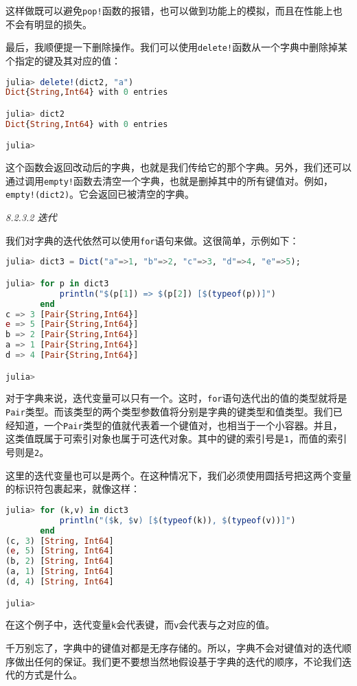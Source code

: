 这样做既可以避免\verb`pop!`函数的报错，也可以做到功能上的模拟，而且在性能上也不会有明显的损失。

最后，我顺便提一下删除操作。我们可以使用\verb`delete!`函数从一个字典中删除掉某个指定的键及其对应的值：
\begin{lstlisting}[language=julia]
julia> delete!(dict2, "a")
Dict{String,Int64} with 0 entries

julia> dict2
Dict{String,Int64} with 0 entries

julia> 
\end{lstlisting}

这个函数会返回改动后的字典，也就是我们传给它的那个字典。另外，我们还可以通过调用\verb`empty!`函数去清空一个字典，也就是删掉其中的所有键值对。例如，\verb`empty!(dict2)`。它会返回已被清空的字典。

\textsl{8.2.3.2 迭代}

我们对字典的迭代依然可以使用\verb`for`语句来做。这很简单，示例如下：
\begin{lstlisting}[language=julia]
julia> dict3 = Dict("a"=>1, "b"=>2, "c"=>3, "d"=>4, "e"=>5);

julia> for p in dict3
           println("$(p[1]) => $(p[2]) [$(typeof(p))]")
       end
c => 3 [Pair{String,Int64}]
e => 5 [Pair{String,Int64}]
b => 2 [Pair{String,Int64}]
a => 1 [Pair{String,Int64}]
d => 4 [Pair{String,Int64}]

julia> 
\end{lstlisting}

对于字典来说，迭代变量可以只有一个。这时，\verb`for`语句迭代出的值的类型就将是\verb`Pair`类型。而该类型的两个类型参数值将分别是字典的键类型和值类型。我们已经知道，一个\verb`Pair`类型的值就代表着一个键值对，也相当于一个小容器。并且，这类值既属于可索引对象也属于可迭代对象。其中的键的索引号是\verb`1`，而值的索引号则是\verb`2`。

这里的迭代变量也可以是两个。在这种情况下，我们必须使用圆括号把这两个变量的标识符包裹起来，就像这样：
\begin{lstlisting}[language=julia]
julia> for (k,v) in dict3
           println("($k, $v) [$(typeof(k)), $(typeof(v))]")
       end
(c, 3) [String, Int64]
(e, 5) [String, Int64]
(b, 2) [String, Int64]
(a, 1) [String, Int64]
(d, 4) [String, Int64]

julia> 
\end{lstlisting}

在这个例子中，迭代变量\verb`k`会代表键，而\verb`v`会代表与之对应的值。

千万别忘了，字典中的键值对都是无序存储的。所以，字典不会对键值对的迭代顺序做出任何的保证。我们更不要想当然地假设基于字典的迭代的顺序，不论我们迭代的方式是什么。

